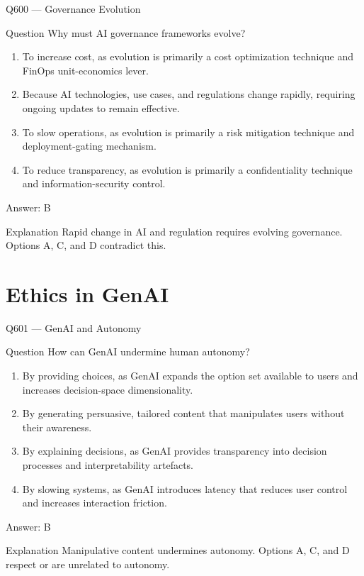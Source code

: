 \documentclass[aspectratio=169,8pt]{beamer}
\begin{document}
	\begin{frame}{Q600 --- Governance Evolution}
		\begin{block}{Question}
			Why must AI governance frameworks evolve?
			\begin{enumerate}
				\item To increase cost, as evolution is primarily a cost optimization technique and FinOps unit-economics lever.
				\item Because AI technologies, use cases, and regulations change rapidly, requiring ongoing updates to remain effective.
				\item To slow operations, as evolution is primarily a risk mitigation technique and deployment-gating mechanism.
				\item To reduce transparency, as evolution is primarily a confidentiality technique and information-security control.
			\end{enumerate}
		\end{block}
		\begin{exampleblock}{Answer: B}\end{exampleblock}
		\begin{block}{Explanation}
			Rapid change in AI and regulation requires evolving governance. Options A, C, and D contradict this.
		\end{block}
	\end{frame}
	
	\section{Ethics in GenAI}
	
	\begin{frame}{Q601 --- GenAI and Autonomy}
		\begin{block}{Question}
			How can GenAI undermine human autonomy?
			\begin{enumerate}
				\item By providing choices, as GenAI expands the option set available to users and increases decision-space dimensionality.
				\item By generating persuasive, tailored content that manipulates users without their awareness.
				\item By explaining decisions, as GenAI provides transparency into decision processes and interpretability artefacts.
				\item By slowing systems, as GenAI introduces latency that reduces user control and increases interaction friction.
			\end{enumerate}
		\end{block}
		\begin{exampleblock}{Answer: B}\end{exampleblock}
		\begin{block}{Explanation}
			Manipulative content undermines autonomy. Options A, C, and D respect or are unrelated to autonomy.
		\end{block}
	\end{frame}
	
\end{document}
